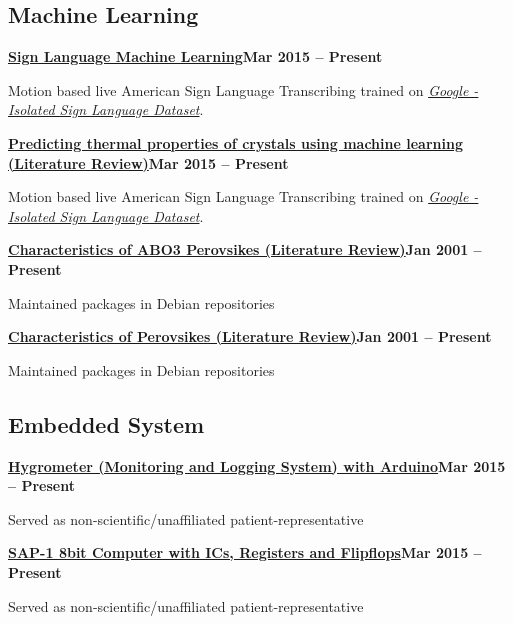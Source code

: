 \documentclass[letterpaper,10pt]{article}
\newcommand{\heading}[2]{
  \hspace{10pt}#1\hfill#2\\
}
\newcommand{\headingBf}[2]{
  \heading{\textbf{#1}}{\textbf{#2}}
}
\newenvironment{resume_list}{
  \vspace{-7pt}
  \begin{itemize}[itemsep=-2px, parsep=1pt, leftmargin=30pt]
}{
  \end{itemize}
}
\begin{document}
  \subsection{Machine Learning}

  \headingBf{\href{https://github.com/omarfarukof/mlphonons}{Sign Language Machine Learning}}{Mar 2015 -- Present}
  \begin{resume_list}
    \item Motion based live American Sign Language Transcribing trained on \href{https://www.kaggle.com/competitions/asl-signs}{\textit{Google - Isolated Sign Language Dataset}}.
  \end{resume_list}

  \headingBf{\href{https://github.com/omarfarukof/Sign_Language_Prediction}{Predicting thermal properties of crystals using machine learning (Literature Review)}}{Mar 2015 -- Present}
  \begin{resume_list}
    \item Motion based live American Sign Language Transcribing trained on \href{https://www.kaggle.com/competitions/asl-signs}{\textit{Google - Isolated Sign Language Dataset}}.
  \end{resume_list}

  \headingBf{\href{https://github.com/omarfarukof/ABO3_Perovskites_Classification}{Characteristics of ABO3 Perovsikes (Literature Review)}}{Jan 2001 -- Present}
  \begin{resume_list}
    \item Maintained packages in Debian repositories
  \end{resume_list}

  \headingBf{\href{https://github.com/omarfarukof/perovskites_MC_ML}{Characteristics of Perovsikes (Literature Review)}}{Jan 2001 -- Present}
  \begin{resume_list}
    \item Maintained packages in Debian repositories
  \end{resume_list}

  \subsection{Embedded System}

  \headingBf{\href{https://github.com/omarfarukof/Hygrometer}{Hygrometer (Monitoring and Logging System) with Arduino}}{Mar 2015 -- Present}
  \begin{resume_list}
    \item Served as non-scientific/unaffiliated patient-representative
  \end{resume_list}
 \headingBf{\href{https://github.com/omarfarukof/SAP-1}{SAP-1 8bit Computer with ICs, Registers and Flipflops}}{Mar 2015 -- Present}
  \begin{resume_list}
    \item Served as non-scientific/unaffiliated patient-representative
  \end{resume_list}
\end{document}
